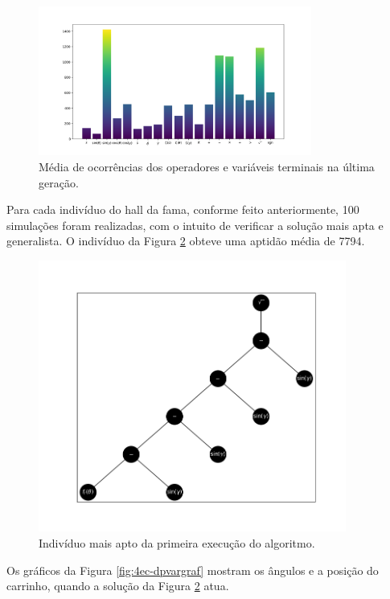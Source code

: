 \begin{figure}[H]
	\centering
	\includegraphics[width=0.8\textwidth]{02_desenvolvimento/04_EC_Fig_DPOperHist.png}
	\caption{Média de ocorrências dos operadores e variáveis terminais na última geração.}
	\label{fig:4ec-dpoperhist}
\end{figure}

Para cada indivíduo do hall da fama, conforme feito anteriormente, 100 simulações foram realizadas, com o intuito de verificar a solução mais apta e generalista. O indivíduo da Figura \ref{fig:4ec-dpindiv1} obteve uma aptidão média de 7794.

\begin{figure}[H]
	\centering
	\includegraphics[width=0.9\textwidth]{02_desenvolvimento/04_EC_Fig_DPIndiv1}
	\caption{Indivíduo mais apto da primeira execução do algoritmo.}
	\label{fig:4ec-dpindiv1}
\end{figure}

Os gráficos da Figura \ref{fig:4ec-dpvargraf} mostram os ângulos e a posição do carrinho, quando a solução da Figura \ref{fig:4ec-dpindiv1} atua. 

